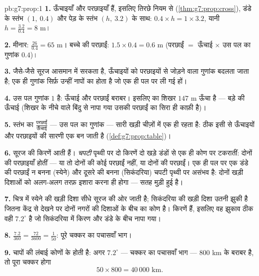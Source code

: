 \begin{solution}{pb:g7:prop:1}
\textbf{1.} ऊँचाइयाँ और परछाइयाँ  हैं, इसलिए तिरछे नियम
से (\cref{thm:g7:prop:cross}), डंडे के स्तंभ $(1,\ 0.4)$ और पेड़
के स्तंभ $(h,\ 3.2)$ के साथ: $0.4 \times h = 1 \times 3.2$, यानी
$h = \frac{3.2}{0.4} = 8$ m।

\textbf{2.} मीनार: $\frac{26}{0.4} = 65$ m। बच्चे की परछाईं:
$1.5 \times 0.4 = 0.6$ m (परछाईं $=$ ऊँचाई $\times$ उस पल का
गुणांक $0.4$)।

\textbf{3.} जैसे-जैसे सूरज आसमान में सरकता है, ऊँचाइयों को
परछाइयों से जोड़ने वाला गुणांक बदलता जाता है; एक ही गुणांक सिर्फ़
उन्हीं नापों का होता है जो एक ही पल पर ली गई हों।

\textbf{4.} उस पल गुणांक $1$ है: ऊँचाई और परछाईं बराबर। इसलिए
 का शिखर $147$ m ऊँचा है --- बड़े  की ऊँचाई (शिखर
के नीचे वाले बिंदु से नापा गया उसकी परछाईं का सिरा ही काफ़ी है)।

\textbf{5.} स्तंभ का  $\frac{\text{परछाईं}}{\text{ऊँचाई}}$
--- उस पल का  गुणांक --- सारी खड़ी चीज़ों में एक ही रहता
है: ठीक इसी से ऊँचाइयों और परछाइयों की सारणी एक  बन
जाती है (\cref{def:g7:prop:table})।

\textbf{6.} सूरज की किरणें  आती हैं। \emph{चपटी} पृथ्वी पर
दो  किरणें दो खड़े डंडों से एक ही कोण पर टकरातीं: दोनों की
परछाइयाँ  होतीं --- या तो दोनों की कोई परछाईं नहीं, या
दोनों की परछाईं। एक ही पल पर एक डंडे की परछाईं न बनना (स्येने) और
दूसरे की बनना (सिकंदरिया) चपटी पृथ्वी पर असंभव है: दोनों खड़ी
दिशाओं को अलग-अलग तरफ़ इशारा करना ही होगा --- सतह मुड़ी हुई है।

\textbf{7.} चित्र में स्येने की खड़ी दिशा सीधे सूरज की ओर जाती है;
सिकंदरिया की खड़ी दिशा उतनी झुकी है जितना केंद्र से देखने पर दोनों
नगरों की दिशाओं के बीच का कोण है। किरणें  हैं, इसलिए वह झुकाव
ठीक वही $7.2^\circ$ है जो सिकंदरिया में किरण और डंडे के बीच नापा
गया।

\textbf{8.} $\frac{7.2}{360} = \frac{72}{3600} = \frac{1}{50}$:
पूरे चक्कर का पचासवाँ भाग।

\textbf{9.} चापों की लंबाई कोणों के  होती है: अगर
$7.2^\circ$ --- चक्कर का पचासवाँ भाग --- $800$ km के बराबर है, तो
पूरा चक्कर होगा
\[
50 \times 800 = 40\,000 \text{ km}.
\]


\end{solution}
